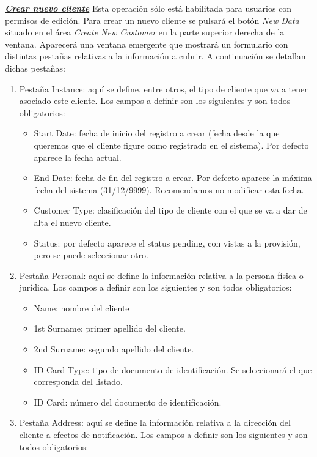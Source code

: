 \underline{\textsl{\textbf{Crear nuevo cliente}}}\newline
Esta operación sólo está habilitada para usuarios con permisos de edición.
Para crear un nuevo cliente se pulsará el botón \textit{New Data} situado en el área \emph{Create New Customer} en la parte superior derecha de la ventana. Aparecerá una ventana emergente que mostrará un formulario con distintas pestañas relativas a la información a cubrir. A continuación se detallan dichas pestañas:
\begin{enumerate}
\item Pestaña Instance: aquí se define, entre otros, el tipo de cliente que va a tener asociado este cliente. Los campos a definir son los siguientes y son todos obligatorios:
	\begin{itemize}
	\item Start Date: fecha de inicio del registro a crear (fecha desde la que queremos que el cliente figure como registrado en el sistema). Por defecto aparece la fecha actual.
	\item End Date: fecha de fin del registro a crear. Por defecto aparece la máxima fecha del sistema (31/12/9999). Recomendamos no modificar esta fecha.
	\item Customer Type: clasificación del tipo de cliente con el que se va a dar de alta el nuevo cliente.
	\item Status: por defecto aparece el status pending, con vistas a la provisión, pero se puede seleccionar otro.
	\end{itemize}
\item Pestaña Personal: aquí se define la información relativa a la persona física o jurídica. Los campos a definir son los siguientes y son todos obligatorios:
	\begin{itemize}
	\item Name: nombre del cliente
	\item 1st Surname: primer apellido del cliente.
	\item 2nd Surname: segundo apellido del cliente.
	\item ID Card Type: tipo de documento de identificación. Se seleccionará el que corresponda del listado.
	\item ID Card: número del documento de identificación.
	\end{itemize}
\item Pestaña Address: aquí se define la información relativa a la dirección del cliente a efectos de notificación. Los campos a definir son los siguientes y son todos obligatorios:

\end{enumerate}
